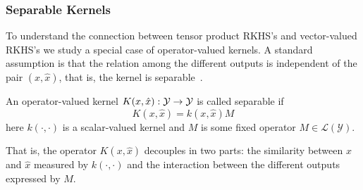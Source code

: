 \subsubsection*{Separable Kernels}
To understand the connection between tensor product RKHS's and vector-valued RKHS's we study a special case of operator-valued kernels.
A standard assumption is that the relation among the different outputs is independent of the pair $(x, \hat{x})$, that is, the kernel is separable~\citep{AlvarezRL12, KadriDPCRA16}.
\begin{definition}
    An operator-valued kernel $K(x, \hat{x}): \mathcal{Y} \to \mathcal{Y}$ is called separable if
    $$ K(x, \hat{x})  = k(x, \hat{x}) M$$
    here $k(\cdot, \cdot)$ is a scalar-valued kernel and $M$ is some fixed operator $M \in \mathcal{L}(\mathcal{Y})$.
\end{definition}
That is, the operator $K(x, \hat{x})$ decouples in two parts: the similarity between $x$ and $\hat{x}$ measured by $k(\cdot,\cdot)$ and the interaction between the different outputs expressed by $M$. 
%

